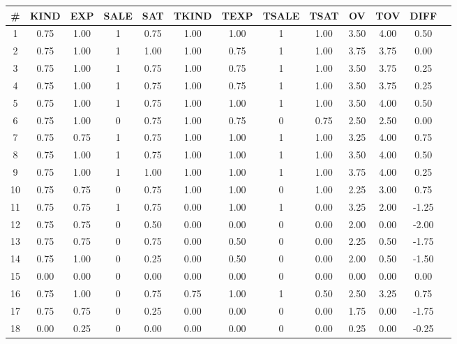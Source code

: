 \begin{center}
      \begin{tabular}{ccccccccccccc}
            \toprule
            \# & KIND & EXP  & SALE & SAT  & TKIND & TEXP & TSALE & TSAT & OV   & TOV  & DIFF  \\
            \midrule
            1  & 0.75 & 1.00 & 1    & 0.75 & 1.00  & 1.00 & 1     & 1.00 & 3.50 & 4.00 & 0.50  \\
            2  & 0.75 & 1.00 & 1    & 1.00 & 1.00  & 0.75 & 1     & 1.00 & 3.75 & 3.75 & 0.00  \\
            3  & 0.75 & 1.00 & 1    & 0.75 & 1.00  & 0.75 & 1     & 1.00 & 3.50 & 3.75 & 0.25  \\
            4  & 0.75 & 1.00 & 1    & 0.75 & 1.00  & 0.75 & 1     & 1.00 & 3.50 & 3.75 & 0.25  \\
            5  & 0.75 & 1.00 & 1    & 0.75 & 1.00  & 1.00 & 1     & 1.00 & 3.50 & 4.00 & 0.50  \\
            6  & 0.75 & 1.00 & 0    & 0.75 & 1.00  & 0.75 & 0     & 0.75 & 2.50 & 2.50 & 0.00  \\
            7  & 0.75 & 0.75 & 1    & 0.75 & 1.00  & 1.00 & 1     & 1.00 & 3.25 & 4.00 & 0.75  \\
            8  & 0.75 & 1.00 & 1    & 0.75 & 1.00  & 1.00 & 1     & 1.00 & 3.50 & 4.00 & 0.50  \\
            9  & 0.75 & 1.00 & 1    & 1.00 & 1.00  & 1.00 & 1     & 1.00 & 3.75 & 4.00 & 0.25  \\
            10 & 0.75 & 0.75 & 0    & 0.75 & 1.00  & 1.00 & 0     & 1.00 & 2.25 & 3.00 & 0.75  \\
            11 & 0.75 & 0.75 & 1    & 0.75 & 0.00  & 1.00 & 1     & 0.00 & 3.25 & 2.00 & -1.25 \\
            12 & 0.75 & 0.75 & 0    & 0.50 & 0.00  & 0.00 & 0     & 0.00 & 2.00 & 0.00 & -2.00 \\
            13 & 0.75 & 0.75 & 0    & 0.75 & 0.00  & 0.50 & 0     & 0.00 & 2.25 & 0.50 & -1.75 \\
            14 & 0.75 & 1.00 & 0    & 0.25 & 0.00  & 0.50 & 0     & 0.00 & 2.00 & 0.50 & -1.50 \\
            15 & 0.00 & 0.00 & 0    & 0.00 & 0.00  & 0.00 & 0     & 0.00 & 0.00 & 0.00 & 0.00  \\
            16 & 0.75 & 1.00 & 0    & 0.75 & 0.75  & 1.00 & 1     & 0.50 & 2.50 & 3.25 & 0.75  \\
            17 & 0.75 & 0.75 & 0    & 0.25 & 0.00  & 0.00 & 0     & 0.00 & 1.75 & 0.00 & -1.75 \\
            18 & 0.00 & 0.25 & 0    & 0.00 & 0.00  & 0.00 & 0     & 0.00 & 0.25 & 0.00 & -0.25 \\
            \bottomrule
      \end{tabular}
\end{center}

